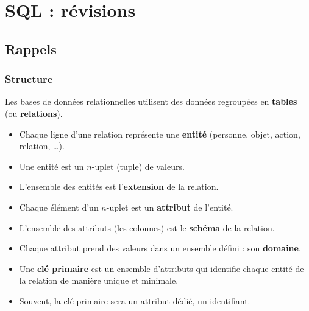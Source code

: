 \chapter{SQL : révisions}
\thispagestyle{empty}
\section{Rappels}
\subsection{Structure}
Les bases de données relationnelles utilisent des données regroupées en {\bf tables} (ou {\bf relations}). 

\begin{itemize}
    \item Chaque ligne d'une relation représente une {\bf entité} (personne, objet, action, relation, \dots).
    \item Une entité est un $n$-uplet (tuple) de valeurs.
    \item L'ensemble des entités est l'{\bf extension} de la relation.
    \item Chaque élément d'un $n$-uplet est un {\bf attribut} de l'entité.
    \item L'ensemble des attributs (les colonnes) est le {\bf schéma} de la relation.
    \item Chaque attribut prend des valeurs dans un ensemble défini : son {\bf domaine}.
    \item Une {\bf clé primaire} est un ensemble d'attributs qui identifie chaque entité de la relation de manière unique et minimale.
    \item Souvent, la clé primaire sera un attribut dédié, un identifiant.
\end{itemize}
